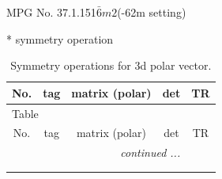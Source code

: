 \documentclass[fleqn,8pt]{jsarticle}
\begin{document}
\setcounter{MaxMatrixCols}{32}

\renewcommand{\tablename}{Table~}
\renewcommand{\figurename}{Figure~}
\begin{center}
\LARGE
MPG No. 37.1.151\quad$\bar{6}m2$\quad(-62m setting)
\end{center}
* symmetry operation
\renewcommand{\arraystretch}{1.3}
\begin{longtable}{ccccc}
\caption{Symmetry operations for 3d polar vector.}
 \\
 \hline \hline
No. & tag & matrix (polar) & det & TR \\ \hline \endfirsthead

\multicolumn{4}{l}{\tablename\ \thetable{}} \\
 \hline \hline
No. & tag & matrix (polar) & det & TR \\ \hline \endhead

 \hline \hline
\multicolumn{4}{r}{\footnotesize\it continued ...} \\ \endfoot

 \hline \hline
\multicolumn{4}{r}{} \\ \endlastfoot


\end{longtable}
\end{document}
